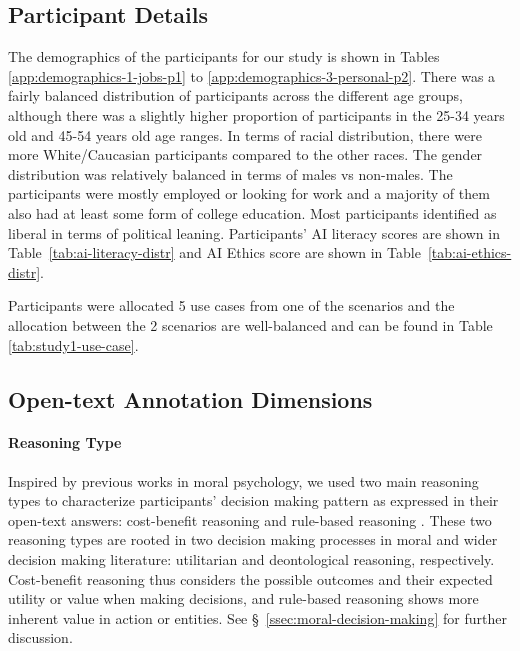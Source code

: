 \subsection{Participant Details}
\label{app:participant-details}
The demographics of the participants for our study is shown in Tables \ref{app:demographics-1-jobs-p1} to \ref{app:demographics-3-personal-p2}. There was a fairly balanced distribution of participants across the different age groups, although there was a slightly higher proportion of participants in the 25-34 years old and 45-54 years old age ranges. In terms of racial distribution, there were more White/Caucasian participants compared to the other races. The gender distribution was relatively balanced in terms of males vs non-males. The participants were mostly employed or looking for work and a majority of them also had at least some form of college education. Most participants identified as liberal in terms of political leaning. Participants' AI literacy scores are shown in Table~\ref{tab:ai-literacy-distr} and AI Ethics score are shown in Table~\ref{tab:ai-ethics-distr}.

Participants were allocated 5 use cases from one of the scenarios and the allocation between the 2 scenarios are well-balanced and can be found in Table \ref{tab:study1-use-case}.










\subsection{Open-text Annotation Dimensions}
\label{sssec:reasoning-dim}
\paragraph{Reasoning Type}
Inspired by previous works in moral psychology, we used two main reasoning types to characterize participants' decision making pattern as expressed in their open-text answers: cost-benefit reasoning and rule-based reasoning \citep{cheung2024measuring}. These two reasoning types are rooted in two decision making processes in moral and wider decision making literature: utilitarian and deontological reasoning, respectively. Cost-benefit reasoning thus considers the possible outcomes and their expected utility or value when making decisions, and rule-based reasoning shows more inherent value in action or entities. See \S~\ref{ssec:moral-decision-making} for further discussion.

